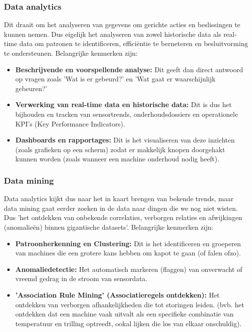 \documentclass[a4paper,11pt,twoside]{report}
\begin{document}
\subsubsection{Data analytics}
Dit draait om het analyseren van gegevens om gerichte acties en beslissingen te kunnen nemen. Dus
eigelijk het analyseren van zowel historische data als real-time data om patronen te identificeren,
efficiëntie te berneteren en besluitvorming te ondersteunen. Belangrijke kenmerken zijn:
\begin{itemize}
    \item \textbf{Beschrijvende en voorspellende analyse:} Dit geeft dan direct antwoord op vragen
    zoals 'Wat is er gebeurd?' en 'Wat gaat er waarschijnlijk gebeuren?'
    \item \textbf{Verwerking van real-time data en historische data:} Dit is dus het bijhouden en
    tracken van sensortrends, onderhoudsdossiers en operationele KPI's (Key Performance Indicators).
    \item \textbf{Dashboards en rapportages:} Dit is het visualiseren van deze inzichten (zoals
    grafieken op een scherm) zodat er makkelijk knopen doorgehakt kunnen worden (zoals wanneer een
    machine onderhoud nodig heeft).
\end{itemize}
\subsubsection{Data mining}
Data analytics kijkt dus naar het in kaart brengen van bekende trends, maar data mining gaat eerder
zoeken in de data naar dingen die we nog niet wisten. Dus 'het ontdekken van onbekende correlaties,
verborgen relaties en afwijkingen (anomalieën) binnen gigantische datasets'. Belangrijke kenmerken
zijn:
\begin{itemize}
    \item \textbf{Patroonherkenning en Clustering:} Dit is het identificeren en groeperen van
    machines die een grotere kans hebben om kapot te gaan (of falen ofzo).
    \item \textbf{Anomaliedetectie:} Het automatisch markeren (flaggen) van onverwacht of vreemd
    gedrag in de stroom van sensordata.
    \item \textbf{'Association Rule Mining' (Associatieregels ontdekken):} Het ontdekken van
    verborgen afhankelijkheden die tot storingen leiden. (bvb. het ontdekken dat een machine vaak
    uitvalt als een specifieke combinatie van temperatuur en trilling optreedt, ookal lijken die los
    van elkaar onschuldig).
\end{itemize}
\end{document}
